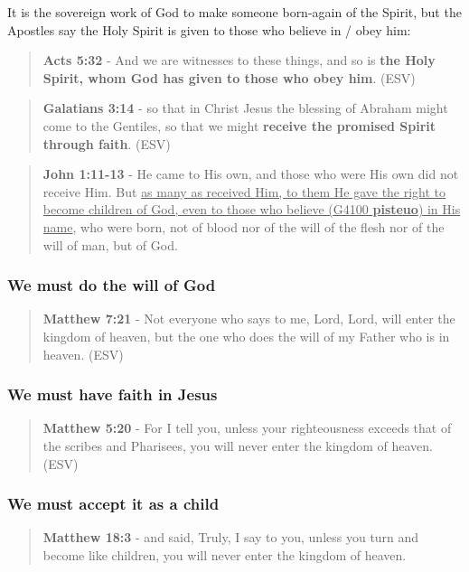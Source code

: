 \documentclass[11pt]{article}
\begin{document}
It is the sovereign work of God to make someone born-again of the Spirit, but the Apostles say the Holy Spirit is given to those who believe in / obey him:

\begin{quote}
\textbf{Acts 5:32} - And we are witnesses to these things, and so is \textbf{the Holy Spirit, whom God has given to those who obey him}. (ESV)
\end{quote}

\begin{quote}
\textbf{Galatians 3:14} - so that in Christ Jesus the blessing of Abraham might come to the Gentiles, so that we might \textbf{receive the promised Spirit through faith}. (ESV)
\end{quote}

\begin{quote}
\textbf{John 1:11-13} - He came to His own, and those who were His own did not receive Him. But \uline{as many as received Him, to them He gave the right to become children of God, even to those who believe (G4100 \textbf{pisteuo}) in His name}, who were born, not of blood nor of the will of the flesh nor of the will of man, but of God.
\end{quote}

\subsubsection{We must do the will of God}
\label{sec:orgc8b662a}
\begin{quote}
\textbf{Matthew 7:21} - Not everyone who says to me, Lord, Lord, will enter the kingdom of heaven, but the one who does the will of my Father who is in heaven. (ESV)
\end{quote}

\subsubsection{We must have faith in Jesus}
\label{sec:org32d7755}
\begin{quote}
\textbf{Matthew 5:20} - For I tell you, unless your righteousness exceeds that of the scribes and Pharisees, you will never enter the kingdom of heaven. (ESV)
\end{quote}

\subsubsection{We must accept it as a child}
\label{sec:org7d0e857}
\begin{quote}
\textbf{Matthew 18:3} - and said, Truly, I say to you, unless you turn and become like children, you will never enter the kingdom of heaven.
\end{quote}
\end{document}
